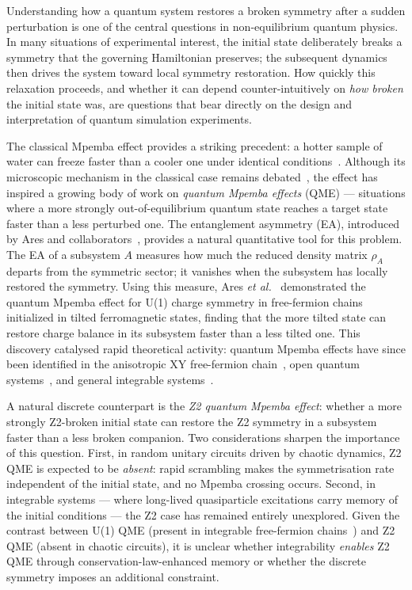 
Understanding how a quantum system restores a broken symmetry after a sudden
perturbation is one of the central questions in non-equilibrium quantum physics.
In many situations of experimental interest, the initial state deliberately breaks
a symmetry that the governing Hamiltonian preserves; the subsequent dynamics then
drives the system toward local symmetry restoration.
How quickly this relaxation proceeds, and whether it can depend counter-intuitively
on \emph{how broken} the initial state was, are questions that bear directly on
the design and interpretation of quantum simulation experiments.

The classical Mpemba effect provides a striking precedent: a hotter sample of
water can freeze faster than a cooler one under identical conditions~\cite{Mpemba1969}.
Although its microscopic mechanism in the classical case remains debated~\cite{Burridge2016},
the effect has inspired a growing body of work on \emph{quantum Mpemba effects}
(QME) — situations where a more strongly out-of-equilibrium quantum state reaches
a target state faster than a less perturbed one.
The entanglement asymmetry (EA), introduced by Ares and collaborators~\cite{Ares2023},
provides a natural quantitative tool for this problem.
The EA of a subsystem $A$ measures how much the reduced density matrix $\rho_A$
departs from the symmetric sector; it vanishes when the subsystem has locally
restored the symmetry.
Using this measure, Ares \textit{et al.}~\cite{Ares2023} demonstrated the quantum
Mpemba effect for U(1) charge symmetry in free-fermion chains initialized in
tilted ferromagnetic states, finding that the more tilted state can restore charge
balance in its subsystem faster than a less tilted one.
This discovery catalysed rapid theoretical activity: quantum Mpemba effects have
since been identified in the anisotropic XY free-fermion chain~\cite{Murciano2024},
open quantum systems~\cite{Carollo2021},
and general integrable systems~\cite{Rylands2024}.

A natural discrete counterpart is the \emph{Z2 quantum Mpemba effect}: whether
a more strongly Z2-broken initial state can restore the Z2 symmetry in a subsystem
faster than a less broken companion.
Two considerations sharpen the importance of this question.
First, in random unitary circuits driven by chaotic dynamics, Z2 QME is expected to be
\emph{absent}: rapid scrambling makes the symmetrisation rate independent of the
initial state, and no Mpemba crossing occurs.
Second, in integrable systems — where long-lived quasiparticle excitations carry
memory of the initial conditions — the Z2 case has remained entirely unexplored.
Given the contrast between U(1) QME (present in integrable free-fermion
chains~\cite{Ares2023}) and Z2 QME (absent in chaotic circuits),
it is unclear whether integrability \emph{enables} Z2 QME through conservation-law-enhanced
memory or whether the discrete symmetry imposes an additional constraint.

